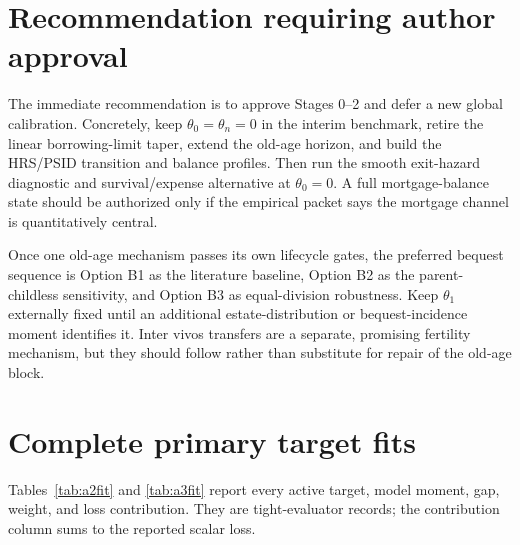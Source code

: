 \documentclass[10pt]{article}
\begin{document}
\section{Recommendation requiring author approval}

The immediate recommendation is to approve Stages 0--2 and defer a new global
calibration. Concretely, keep $\theta_0=\theta_n=0$ in the interim benchmark,
retire the linear borrowing-limit taper, extend the old-age horizon, and build
the HRS/PSID transition and balance profiles. Then run the smooth exit-hazard
diagnostic and survival/expense alternative at $\theta_0=0$. A full
mortgage-balance state should be authorized only if the empirical packet says
the mortgage channel is quantitatively central.

Once one old-age mechanism passes its own lifecycle gates, the preferred
bequest sequence is Option B1 as the literature baseline, Option B2 as the
parent-childless sensitivity, and Option B3 as equal-division robustness. Keep
$\theta_1$ externally fixed until an additional estate-distribution or
bequest-incidence moment identifies it. Inter vivos transfers are a separate,
promising fertility mechanism, but they should follow rather than substitute
for repair of the old-age block.

\clearpage
\appendix
\section{Complete primary target fits}

Tables~\ref{tab:a2fit} and \ref{tab:a3fit} report every active target, model
moment, gap, weight, and loss contribution. They are tight-evaluator records;
the contribution column sums to the reported scalar loss.
\end{document}
